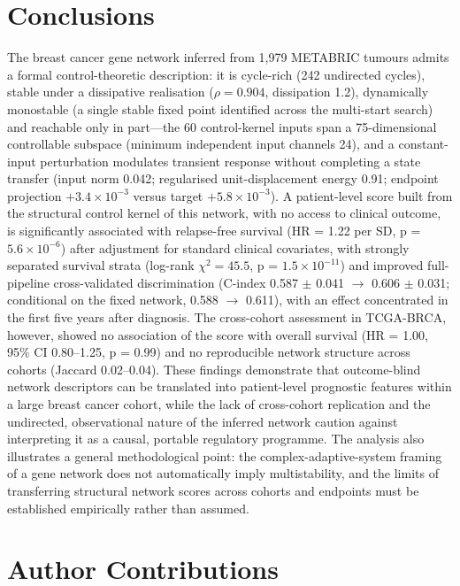 \documentclass[12pt]{article}
\begin{document}
\section{Conclusions}

The breast cancer gene network inferred from 1,979 METABRIC
tumours admits a formal control-theoretic description: it is cycle-rich
(242 undirected cycles), stable under a dissipative realisation ($\rho =
0.904$, dissipation 1.2), dynamically monostable (a single stable fixed
point identified across the multi-start search) and reachable only in
part---the 60 control-kernel inputs span a 75-dimensional controllable
subspace (minimum independent input channels 24), and a constant-input
perturbation modulates transient response without completing a state
transfer (input norm 0.042; regularised unit-displacement energy 0.91;
endpoint projection $+3.4\times10^{-3}$ versus target
$+5.8\times10^{-3}$). A patient-level score built from the structural
control kernel of this network, with no access to clinical outcome, is
significantly associated with relapse-free survival (HR = 1.22 per SD, p =
$5.6\times10^{-6}$) after adjustment for standard clinical covariates, with
strongly separated survival strata (log-rank $\chi^2 = 45.5$, p =
$1.5\times10^{-11}$) and improved full-pipeline cross-validated
discrimination (C-index 0.587 $\pm$ 0.041 $\rightarrow$ 0.606 $\pm$
0.031; conditional on the fixed network, 0.588 $\rightarrow$ 0.611), with
an effect concentrated in the first five years after diagnosis. The cross-cohort assessment in TCGA-BRCA, however,
showed no association of the score with overall survival (HR = 1.00, 95\%
CI 0.80--1.25, p = 0.99) and no reproducible network structure across
cohorts (Jaccard 0.02--0.04). These findings demonstrate that outcome-blind network descriptors can be
translated into patient-level prognostic features within a large breast
cancer cohort, while the lack of cross-cohort replication and the undirected,
observational nature of the inferred network caution against interpreting it
as a causal, portable regulatory programme. The analysis also illustrates a
general methodological point: the complex-adaptive-system framing of a gene
network does not automatically imply multistability, and the limits of
transferring structural network scores across cohorts and endpoints must be
established empirically rather than assumed.

\section*{Author Contributions}
\end{document}
